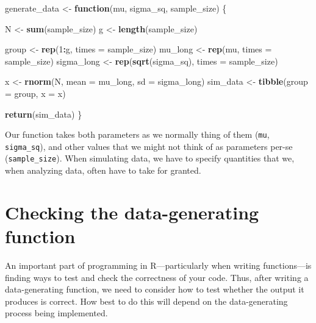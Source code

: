 \documentclass[
]{book}
\newenvironment{Shaded}{\begin{snugshade}}{\end{snugshade}}
\newcommand{\AttributeTok}[1]{\textcolor[rgb]{0.13,0.29,0.53}{#1}}
\newcommand{\ControlFlowTok}[1]{\textcolor[rgb]{0.13,0.29,0.53}{\textbf{#1}}}
\newcommand{\DecValTok}[1]{\textcolor[rgb]{0.00,0.00,0.81}{#1}}
\newcommand{\FunctionTok}[1]{\textcolor[rgb]{0.13,0.29,0.53}{\textbf{#1}}}
\newcommand{\NormalTok}[1]{#1}
\newcommand{\OtherTok}[1]{\textcolor[rgb]{0.56,0.35,0.01}{#1}}
\newcommand{\SpecialCharTok}[1]{\textcolor[rgb]{0.81,0.36,0.00}{\textbf{#1}}}
\begin{document}
\begin{Shaded}
\begin{Highlighting}[]
\NormalTok{generate\_data }\OtherTok{\textless{}{-}} \ControlFlowTok{function}\NormalTok{(mu, sigma\_sq, sample\_size) \{}
  
\NormalTok{  N }\OtherTok{\textless{}{-}} \FunctionTok{sum}\NormalTok{(sample\_size) }
\NormalTok{  g }\OtherTok{\textless{}{-}} \FunctionTok{length}\NormalTok{(sample\_size) }
  
\NormalTok{  group }\OtherTok{\textless{}{-}} \FunctionTok{rep}\NormalTok{(}\DecValTok{1}\SpecialCharTok{:}\NormalTok{g, }\AttributeTok{times =}\NormalTok{ sample\_size) }
\NormalTok{  mu\_long }\OtherTok{\textless{}{-}} \FunctionTok{rep}\NormalTok{(mu, }\AttributeTok{times =}\NormalTok{ sample\_size)}
\NormalTok{  sigma\_long }\OtherTok{\textless{}{-}} \FunctionTok{rep}\NormalTok{(}\FunctionTok{sqrt}\NormalTok{(sigma\_sq), }\AttributeTok{times =}\NormalTok{ sample\_size) }
  
\NormalTok{  x }\OtherTok{\textless{}{-}} \FunctionTok{rnorm}\NormalTok{(N, }\AttributeTok{mean =}\NormalTok{ mu\_long, }\AttributeTok{sd =}\NormalTok{ sigma\_long)}
\NormalTok{  sim\_data }\OtherTok{\textless{}{-}} \FunctionTok{tibble}\NormalTok{(}\AttributeTok{group =}\NormalTok{ group, }\AttributeTok{x =}\NormalTok{ x)}
  
  \FunctionTok{return}\NormalTok{(sim\_data)}
\NormalTok{\}}
\end{Highlighting}
\end{Shaded}

Our function takes both parameters as we normally thing of them (\texttt{mu}, \texttt{sigma\_sq}), and other values that we might not think of as parameters per-se (\texttt{sample\_size}).
When simulating data, we have to specify quantities that we, when analyzing data, often have to take for granted.

\section{Checking the data-generating function}\label{checking-the-data-generating-function}

An important part of programming in R---particularly when writing functions---is finding ways to test and check the correctness of your code. Thus, after writing a data-generating function, we need to consider how to test whether the output it produces is correct. How best to do this will depend on the data-generating process being implemented.
\end{document}

